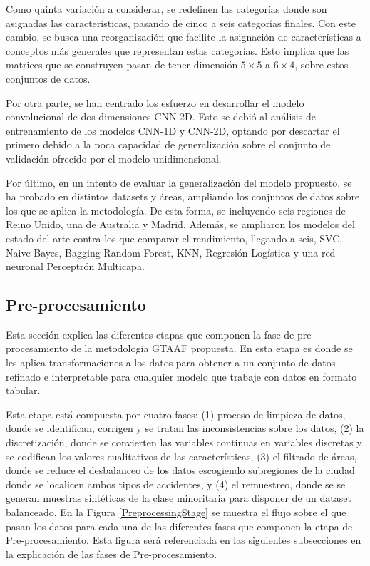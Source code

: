 \documentclass{uathesis-es}
\begin{document}
	
	
	Como quinta variación a considerar, se redefinen las categorías donde son asignadas las características, pasando de cinco a seis categorías finales. Con este cambio, se busca una reorganización que facilite la asignación de características a conceptos más generales que representan estas categorías. Esto implica que las matrices que se construyen pasan de tener dimensión $5\times5$ a $6\times4$, sobre estos conjuntos de datos.
	
	Por otra parte, se han centrado los esfuerzo en desarrollar el modelo convolucional de dos dimensiones CNN-2D. Esto se debió al análisis de entrenamiento de los modelos CNN-1D y CNN-2D, optando por descartar el primero debido a la poca capacidad de generalización sobre el conjunto de validación ofrecido por el modelo unidimensional.
	
	Por último, en un intento de evaluar la generalización del modelo propuesto, se ha probado en distintos datasets y áreas, ampliando los conjuntos de datos sobre los que se aplica la metodología. De esta forma, se incluyendo seis regiones de Reino Unido, una de Australia y Madrid. Además, se ampliaron los modelos del estado del arte contra los que comparar el rendimiento, llegando a seis, SVC, Naive Bayes, Bagging Random Forest, KNN, Regresión Logística y una red neuronal Perceptrón Multicapa.
	
	\subsection{Pre-procesamiento}
	
	Esta sección explica las diferentes etapas que componen la fase de pre-procesamiento de la metodología GTAAF propuesta. En esta etapa es donde se les aplica transformaciones a los datos para obtener a un conjunto de datos refinado e interpretable para cualquier modelo que trabaje con datos en formato tabular. 
	
	Esta etapa está compuesta por cuatro fases: (1) proceso de limpieza de datos, donde se identifican, corrigen y se tratan las inconsistencias sobre los datos, (2) la discretización, donde se convierten las variables continuas en variables discretas y se codifican los valores cualitativos de las características, (3) el filtrado de áreas, donde se reduce el desbalanceo de los datos escogiendo subregiones de la ciudad donde se localicen ambos tipos de accidentes, y (4) el remuestreo, donde se se generan muestras sintéticas de la clase minoritaria para disponer de un dataset balanceado. En la Figura \ref{PreprocessingStage} se muestra el flujo sobre el que pasan los datos para cada una de las diferentes fases que componen la etapa de Pre-procesamiento. Esta figura será referenciada en las siguientes subsecciones en la explicación de las fases de Pre-procesamiento.
	
\end{document}
